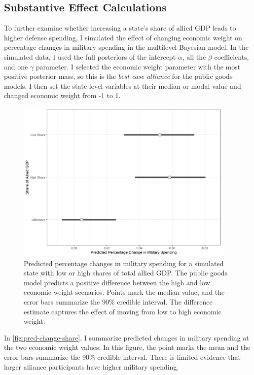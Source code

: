 \documentclass[12pt]{article}
\begin{document}
\subsection{Substantive Effect Calculations}

To further examine whether increasing a state's share of allied GDP leads to higher defense spending, I simulated the effect of changing economic weight on percentage changes in military spending in the multilevel Bayesian model. 
In the simulated data, I used the full posteriors of the intercept $\alpha$, all the $\beta$ coefficients, and one $\gamma$ parameter. 
I selected the economic weight parameter with the most positive posterior mass, so this is the \emph{best case alliance} for the public goods models. 
I then set the state-level variables at their median or modal value and changed economic weight from -1 to 1. 

\begin{figure}[htbp]
	\centering
		\includegraphics[width=0.95\textwidth]{pred-change-share.png}
	\caption{Predicted percentage changes in military spending for a simulated state with low or high shares of total allied GDP. The public goods model predicts a positive difference between the high and low economic weight scenarios. Points mark the median value, and the error bars summarize the 90\% credible interval. The difference estimate captures the effect of moving from low to high economic weight.}
	\label{fig:pred-change-share}
\end{figure}


In \autoref{fig:pred-change-share}, I summarize predicted changes in military spending at the two economic weight values. 
In this figure, the point marks the mean and the error bars summarize the 90\% credible interval. 
There is limited evidence that larger alliance participants have higher military spending. 
\end{document}

